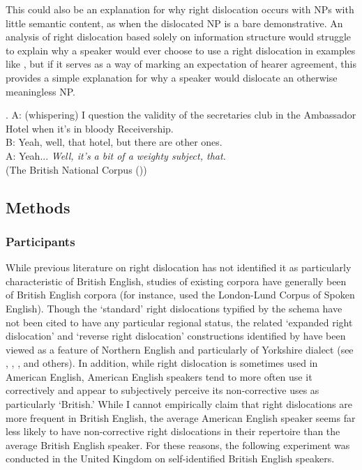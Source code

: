 \documentclass[titlepage,12pt]{article}
\begin{document}
This could also be an explanation for why right dislocation occurs with NPs with little semantic content, as when the dislocated NP is a bare demonstrative. An analysis of right dislocation based solely on information structure would struggle to explain why a speaker would ever choose to use a right dislocation in examples like \Next, but if it serves as a way of marking an expectation of hearer agreement, this provides a simple explanation for why a speaker would dislocate an otherwise meaningless NP.

\ex. A: (whispering) I question the validity of the secretaries club in the Ambassador Hotel when it's in bloody Receivership.\\
B: Yeah, well, that hotel, but there are other ones.\\
A: Yeah... \textit{Well, it's a bit of a weighty subject, that.}\\\phantom{z}\hfill(The British National Corpus (\citealt{bnc_byu_2004}))

\subsection{Methods}

\subsubsection{Participants}

While previous literature on right dislocation has not identified it as particularly characteristic of British English, studies of existing corpora have generally been of British English corpora (for instance, \citet{aijmer_themes_1989} used the London-Lund Corpus of Spoken English). Though the `standard' right dislocations typified by the \citet{grosz_centering_1998} schema have not been cited to have any particular regional status, the related `expanded right dislocation' and `reverse right dislocation' constructions identified by \citet{durham_right_2011} have been viewed as a feature of Northern English and particularly of Yorkshire dialect (see \citealt{visser_historical_1963}, \citealt{edwards_research_1985}, \citealt{durham_right_2011}, and others). In addition, while right dislocation is sometimes used in American English, American English speakers tend to more often use it correctively and appear to subjectively perceive its non-corrective uses as particularly `British.' While I cannot empirically claim that right dislocations are more frequent in British English, the average American English speaker seems far less likely to have non-corrective right dislocations in their repertoire than the average British English speaker. For these reasons, the following experiment was conducted in the United Kingdom on self-identified British English speakers. 
\end{document}
